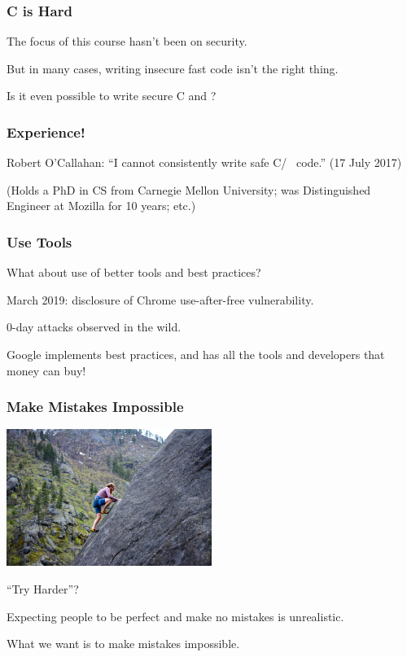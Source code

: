\begin{frame}
\frametitle{C is Hard}
The focus of this course hasn't been on security. 

But in many cases, writing insecure fast code isn't the right thing. 

Is it even possible to write secure C and \CPP?

\end{frame}


\begin{frame}
\frametitle{Experience!}

Robert O'Callahan: ``I cannot consistently write safe C/\CPP~ code.'' (17 July 2017) 

(Holds a PhD in CS from Carnegie Mellon University; was Distinguished Engineer at Mozilla for 10 years; etc.)

\end{frame}


\begin{frame}
\frametitle{Use Tools}

What about use of better tools and best practices?

March 2019: disclosure of Chrome use-after-free vulnerability. 

0-day attacks observed in the wild.

Google implements best practices, and has all the tools and developers that
money can buy!

\end{frame}

\begin{frame}
\frametitle{Make Mistakes Impossible}

\begin{center}
	\includegraphics[width=0.5\textwidth]{images/try-harder.jpeg}
\end{center}
``Try Harder''?

 Expecting people to be perfect and make no mistakes is unrealistic.
 
  What we want is to make mistakes impossible.


\end{frame}


